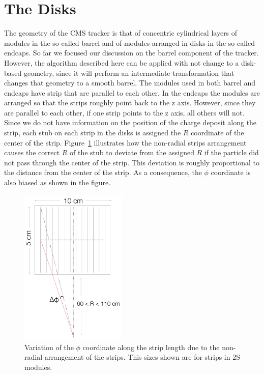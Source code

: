 \documentclass[10pt,a4paper]{report}
\begin{document}
\section{The Disks}

The geometry of the CMS tracker is that of concentric cylindrical layers of modules in the so-called barrel and of modules arranged in disks in the so-called endcaps. So far we focused our discussion on the barrel component of the tracker. However, the algorithm described here can be applied with not change to a disk-based geometry, since it will perform an intermediate transformation that changes that geometry to a smooth barrel. The modules used in both barrel and endcaps have strip that are parallel to each other. In the endcaps the modules are arranged so that the strips roughly point back to the z axis. However, since they are parallel to each other, if one strip points to the z axis, all others will not. Since we do not have information on the position of the charge deposit along the strip, each stub on each strip in the disks is assigned the $R$ coordinate of the center of the strip. Figure~\ref{fig:NonRadialStrips} illustrates how the non-radial strips arrangement causes the correct $R$ of the stub to deviate from the assigned $R$ if the particle did not pass through the center of the strip. This deviation is roughly proportional to the distance from the center of the strip. As a consequence, the $\phi$ coordinate is also biased as shown in the figure.

\begin{figure}
\begin{center}
\includegraphics[width=0.45\textwidth]{Figures/NonRadialStrips.png}
\caption{Variation of the $\phi$ coordinate along the strip length due to the non-radial arrangement of the strips. This sizes shown are for strips in 2S modules.}
\label{fig:NonRadialStrips}
\end{center}
\end{figure}
\end{document}
